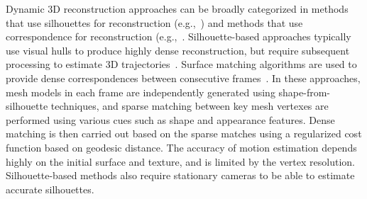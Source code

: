 \documentclass[10pt,twocolumn,letterpaper]{article}
\begin{document}
%
Dynamic 3D reconstruction approaches can be broadly categorized in methods that use silhouettes for reconstruction (e.g.,~\cite{de2008performance,de2007marker,starck2007surface,Zaharescu2011,Budd2013}) and methods that use correspondence for reconstruction (e.g.,~\cite{Vedula2005,Carceroni2002,Devernay2006}. Silhouette-based approaches typically use visual hulls to produce highly dense reconstruction, but require subsequent processing to estimate 3D trajectories~\cite{de2008performance,starck2007surface}. Surface matching algorithms are used to provide dense correspondences between consecutive frames~\cite{Tung2010,Starck2005,Varanasi2008}. In these approaches, mesh models in each frame are independently generated using shape-from-silhouette techniques, and sparse matching between key mesh vertexes are performed using various cues such as shape and appearance features. Dense matching is then carried out based on the sparse matches using a regularized cost function based on geodesic distance. The accuracy of motion estimation depends highly on the initial surface and texture, and is limited by the vertex resolution. Silhouette-based methods also require stationary cameras to be able to estimate accurate silhouettes.
\end{document}
